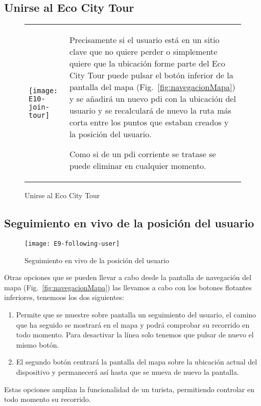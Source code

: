 \subsection{Unirse al Eco City Tour}
\begin{figure}[H]
	\centering
	\begin{tabular}{m{} m{}}
		\texttt{[image: E10-join-tour]} & 
		\vspace{-10pt}
		Precisamente si el usuario está en un sitio clave que no quiere perder o simplemente quiere que la ubicación forme parte del Eco City Tour puede pulsar el botón inferior de la pantalla del mapa (Fig.~\ref{fig:navegacionMapa}) y se añadirá un nuevo \acrshort{pdi} con la ubicación del usuario y se recalculará de nuevo la ruta más corta entre los puntos que estaban creados y la posición del usuario.
		
		Como si de un \acrlong{pdi} corriente se tratase se puede eliminar en cualquier momento.
	\end{tabular}
	\caption{Unirse al Eco City Tour}
	\label{fig:joinECT}
\end{figure}

\subsection{Seguimiento en vivo de la posición del usuario}
\begin{figure}[H]
	\centering
	\texttt{[image: E9-following-user]} 
	\caption{Seguimiento en vivo de la posición del usuario}
	\label{fig:followingUser}
	\vspace{-10pt}
\end{figure}

Otras opciones que se pueden llevar a cabo desde la pantalla de navegación del mapa (Fig.~\ref{fig:navegacionMapa}) las llevamos a cabo con los botones flotantes inferiores, tenemoos los dos siguientes:
		
\begin{enumerate}
	\item Permite que se muestre sobre pantalla un seguimiento del usuario, el camino que ha seguido se mostrará en el mapa y podrá comprobar su recorrido en todo momento. Para desactivar la línea solo tenemos que pulsar de nuevo el mismo botón.
	\item El segundo botón centrará la pantalla del mapa sobre la ubicación actual del dispositivo y permanecerá así hasta que se mueva de nuevo la pantalla.
\end{enumerate}		

Estas opciones amplían la funcionalidad de un turista, permitiendo controlar en todo momento su recorrido.






